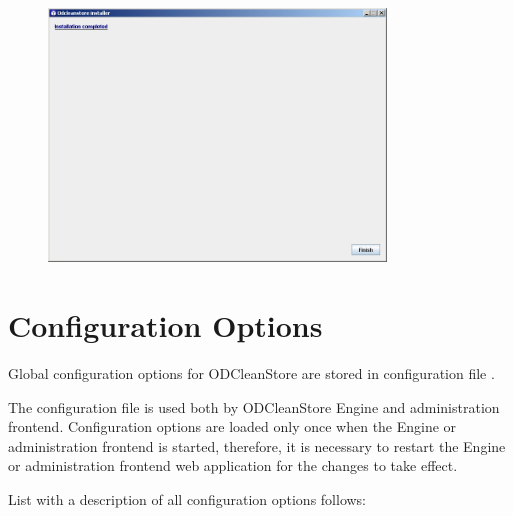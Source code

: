 \FloatBarrier

\begin{figure}[!h]
    \centering
    \includegraphics[width=0.8\textwidth]{images/install-step11.png}
\end{figure}

\FloatBarrier



\chapter{Configuration Options}
 \label{chap:configOptions}
Global configuration options for ODCleanStore are stored in configuration file . 

The configuration file is used both by ODCleanStore Engine and administration frontend. Configuration options are loaded only once when the Engine or administration frontend is started, therefore, it is necessary to restart the Engine or administration frontend web application for the changes to take effect.

List with a description of all configuration options follows:


